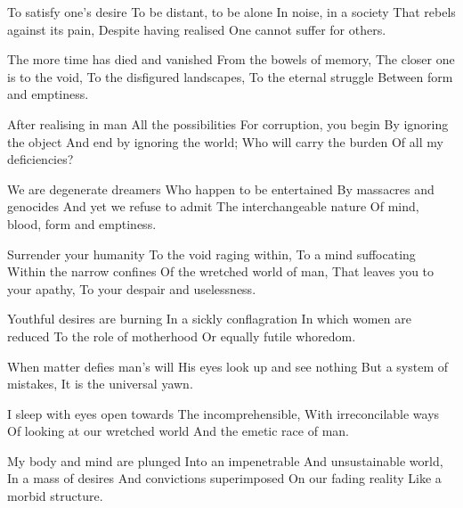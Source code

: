 \documentclass{article}
\newenvironment{stanza}{\begin{minipage}{10cm}\begin{internallinenumbers}\obeylines}{\end{internallinenumbers}\end{minipage}\vspace{\baselineskip}}
\begin{document}
\begin{stanza}
To satisfy one's desire
To be distant, to be alone
In noise, in a society
That rebels against its pain,
Despite having realised
One cannot suffer for others.
\end{stanza}

\begin{stanza}
The more time has died and vanished
From the bowels of memory,
The closer one is to the void,
To the disfigured landscapes,
To the eternal struggle
Between form and emptiness.
\end{stanza}

\begin{stanza}
After realising in man
All the possibilities
For corruption, you begin
By ignoring the object
And end by ignoring the world;
Who will carry the burden
Of all my deficiencies?
\end{stanza}

\begin{stanza}
We are degenerate dreamers
Who happen to be entertained
By massacres and genocides
And yet we refuse to admit
The interchangeable nature
Of mind, blood, form and emptiness.
\end{stanza}

\begin{stanza}
Surrender your humanity
To the void raging within,
To a mind suffocating
Within the narrow confines
Of the wretched world of man,
That leaves you to your apathy,
To your despair and uselessness.
\end{stanza}

\begin{stanza}
Youthful desires are burning
In a sickly conflagration
In which women are reduced
To the role of motherhood
Or equally futile whoredom.
\end{stanza}

\begin{stanza}
When matter defies man's will
His eyes look up and see nothing
But a system of mistakes,
It is the universal yawn.
\end{stanza}

\begin{stanza}
I sleep with eyes open towards
The incomprehensible,
With irreconcilable ways
Of looking at our wretched world
And the emetic race of man.
\end{stanza}

\begin{stanza}
My body and mind are plunged
Into an impenetrable
And unsustainable world,
In a mass of desires
And convictions superimposed
On our fading reality
Like a morbid structure.
\end{stanza}
\end{document}
